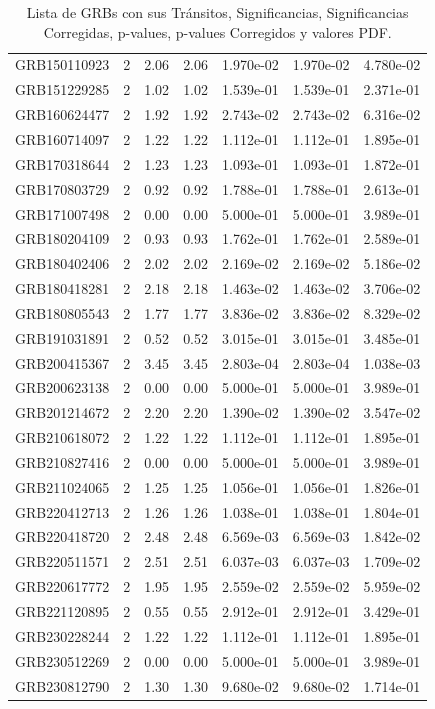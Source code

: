 \documentclass[12pt]{article}
\begin{document}
\begin{table}[h!]
{\begin{tabular}{l c c c c c c}
GRB150110923 & 2 & 2.06 & 2.06 & 1.970e-02 & 1.970e-02 & 4.780e-02 \\
GRB151229285 & 2 & 1.02 & 1.02 & 1.539e-01 & 1.539e-01 & 2.371e-01 \\
GRB160624477 & 2 & 1.92 & 1.92 & 2.743e-02 & 2.743e-02 & 6.316e-02 \\
GRB160714097 & 2 & 1.22 & 1.22 & 1.112e-01 & 1.112e-01 & 1.895e-01 \\
GRB170318644 & 2 & 1.23 & 1.23 & 1.093e-01 & 1.093e-01 & 1.872e-01 \\
GRB170803729 & 2 & 0.92 & 0.92 & 1.788e-01 & 1.788e-01 & 2.613e-01 \\
GRB171007498 & 2 & 0.00 & 0.00 & 5.000e-01 & 5.000e-01 & 3.989e-01 \\
GRB180204109 & 2 & 0.93 & 0.93 & 1.762e-01 & 1.762e-01 & 2.589e-01 \\
GRB180402406 & 2 & 2.02 & 2.02 & 2.169e-02 & 2.169e-02 & 5.186e-02 \\
GRB180418281 & 2 & 2.18 & 2.18 & 1.463e-02 & 1.463e-02 & 3.706e-02 \\
GRB180805543 & 2 & 1.77 & 1.77 & 3.836e-02 & 3.836e-02 & 8.329e-02 \\
GRB191031891 & 2 & 0.52 & 0.52 & 3.015e-01 & 3.015e-01 & 3.485e-01 \\
GRB200415367 & 2 & 3.45 & 3.45 & 2.803e-04 & 2.803e-04 & 1.038e-03 \\
GRB200623138 & 2 & 0.00 & 0.00 & 5.000e-01 & 5.000e-01 & 3.989e-01 \\
GRB201214672 & 2 & 2.20 & 2.20 & 1.390e-02 & 1.390e-02 & 3.547e-02 \\
GRB210618072 & 2 & 1.22 & 1.22 & 1.112e-01 & 1.112e-01 & 1.895e-01 \\
GRB210827416 & 2 & 0.00 & 0.00 & 5.000e-01 & 5.000e-01 & 3.989e-01 \\
GRB211024065 & 2 & 1.25 & 1.25 & 1.056e-01 & 1.056e-01 & 1.826e-01 \\
GRB220412713 & 2 & 1.26 & 1.26 & 1.038e-01 & 1.038e-01 & 1.804e-01 \\
GRB220418720 & 2 & 2.48 & 2.48 & 6.569e-03 & 6.569e-03 & 1.842e-02 \\
GRB220511571 & 2 & 2.51 & 2.51 & 6.037e-03 & 6.037e-03 & 1.709e-02 \\
GRB220617772 & 2 & 1.95 & 1.95 & 2.559e-02 & 2.559e-02 & 5.959e-02 \\
GRB221120895 & 2 & 0.55 & 0.55 & 2.912e-01 & 2.912e-01 & 3.429e-01 \\
GRB230228244 & 2 & 1.22 & 1.22 & 1.112e-01 & 1.112e-01 & 1.895e-01 \\
GRB230512269 & 2 & 0.00 & 0.00 & 5.000e-01 & 5.000e-01 & 3.989e-01 \\
GRB230812790 & 2 & 1.30 & 1.30 & 9.680e-02 & 9.680e-02 & 1.714e-01 \\
\bottomrule
\end{tabular}%
}
\caption{Lista de GRBs con sus Tránsitos, Significancias, Significancias Corregidas, p-values, p-values Corregidos y valores PDF.}
\end{table}
\end{document}
